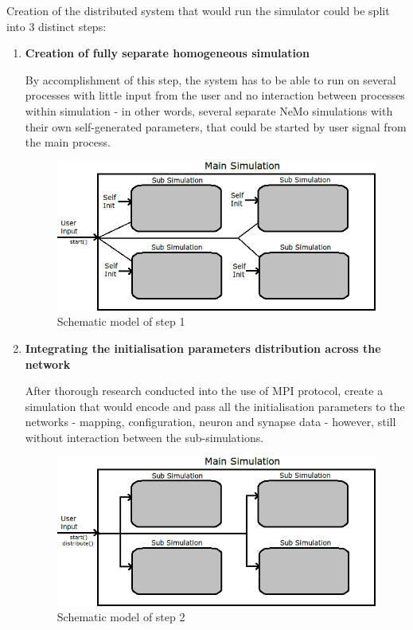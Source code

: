 Creation of the distributed system that would run the simulator could be split into 3 distinct steps:

\begin{enumerate}

\item{\textbf{Creation of fully separate homogeneous simulation}}

By accomplishment of this step, the system has to be able to run on several processes with little input from the user and no interaction between processes within simulation - in other words, several separate NeMo simulations with their own self-generated parameters, that could be started by user signal from the main process.

\begin{figure}[h]
\begin{center}
\includegraphics[scale = 0.25]{images/design_stage_1.png}
\end{center}
\caption{Schematic model of step 1}
\end{figure}

\item{\textbf{Integrating the initialisation parameters distribution across the network}}

After thorough research conducted into the use of MPI protocol, create a simulation that would encode and pass all the initialisation parameters to the networks - mapping, configuration, neuron and synapse data - however, still without interaction between the sub-simulations.

\begin{figure}[h]
\begin{center}
\includegraphics[scale = 0.25]{images/design_stage_2.png}
\end{center}
\caption{Schematic model of step 2}
\end{figure}


\end{enumerate}
